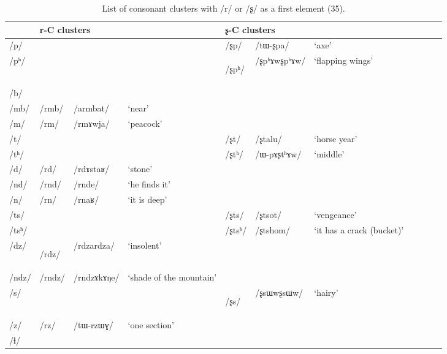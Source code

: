 \documentclass[12pt]{article}
\newcommand{\ipa}[1]{\mbox{\phon/#1/}}
\newcommand{\ipab}[1]{{\phon#1}}
\newcommand{\deux}[1]{\ipa{#1}\addtocounter{2clusters}{1}}
\newcommand{\idph}[1]{\cellcolor{gray}\textbf{#1}}
\begin{document}
\begin{landscape}

  \begin{longtable}{lllllllllll}
 \caption{List of consonant clusters with \ipa{r} or \ipa{ʂ}  as a first element (35).} \label{prein.r}  \\
\toprule
& \multicolumn{3}{l}{\ipab{r}-C clusters} & \multicolumn{3}{l}{\ipab{ʂ}-C clusters}  \\
\midrule
\ipa{p}  & 	  & 	  & 	  & 	 \deux{ʂp}  & 	 \ipa{tɯ-ʂpa}  & 	 `axe'  & 	\\
\ipa{pʰ}  & 	  & 	  & 	  & 	 \deux{ʂpʰ} \idph{}  & 	 \ipa{ʂpʰɤwʂpʰɤw}  & 	 `flapping wings'  & 	\\
\ipa{b}  & 	  & 	  & 	  & 	  & 	  & 	  & 	\\
\ipa{mb}  & 	 \deux{rmb}  & 	 \ipa{armbat}  & 	 `near'  & 	  & 	  & 	  & 	\\
\ipa{m}  & 	 \deux{rm}  & 	 \ipa{rmɤwja}  & 	 `peacock'  & 	  & 	  & 	  & 	\\
\ipa{t}  & 	  & 	  & 	  & 	 \deux{ʂt}  & 	 \ipa{ʂtalu}  & 	 `horse year'  & 	\\
\ipa{tʰ}  & 	  & 	  & 	  & 	 \deux{ʂtʰ}  & 	 \ipa{ɯ-pɤʂtʰɤw}  & 	 `middle'  & 	\\
\ipa{d}  & 	 \deux{rd}  & 	 \ipa{rdɤstaʁ}  & 	 `stone'  & 	  & 	  & 	  & 	\\
\ipa{nd}  & 	 \deux{rnd}  & 	 \ipa{rnde}  & 	 `he finds it'  & 	  & 	  & 	  & 	\\
\ipa{n}  & 	 \deux{rn}  & 	 \ipa{rnaʁ}  & 	 `it is deep'  & 	  & 	  & 	  & 	\\
\ipa{ts}  & 	  & 	  & 	  & 	 \deux{ʂts}  & 	 \ipa{ʂtsot}  & 	 `vengeance'  & 	\\
\ipa{tsʰ}  & 	  & 	  & 	  & 	 \deux{ʂtsʰ}  & 	 \ipa{ʂtshom}  & 	 `it has a crack (bucket)'  & 	\\
\ipa{dz}  & 	 \deux{rdz} \idph{}  & 	 \ipa{rdzardza}  & 	 `insolent'  & 	  & 	  & 	  & 	\\
\ipa{ndz}  & 	 \deux{rndz}  & 	 \ipa{rndzɤkɤŋe}  & 	 `shade of the mountain'  & 	  & 	  & 	  & 	\\
\ipa{s}  & 	  & 	  & 	  & 	 \deux{ʂs} \idph{}  & 	 \ipa{ʂsɯwʂsɯw}  & 	 `hairy'  & 	\\
\ipa{z}  & 	 \deux{rz}  & 	 \ipa{tɯ-rzɯɣ}  & 	 `one section'  & 	  & 	  & 	  & 	\\
\ipa{ɬ}  & 	  & 	  & 	  & 	  & 	  & 	  & 	\\

\end{longtable}
\end{landscape}
\end{document}
